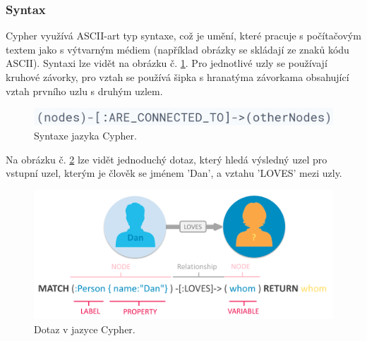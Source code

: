 \subsubsection{Syntax}
Cypher využívá \gls{ASCII}-art typ syntaxe, což je umění, které pracuje s počítačovým textem jako s výtvarným médiem (například obrázky se skládají ze znaků kódu \gls{ASCII}). Syntaxi lze vidět na obrázku č. \ref{fig:cypher_syntax}. Pro jednotlivé uzly se používají kruhové závorky, pro vztah se používá šipka s hranatýma závorkama obsahující vztah prvního uzlu s druhým uzlem.
	\begin{figure}[H]
	\centering
	\includegraphics[width=14cm]{img/databaze/cypher_syntax1}
	\caption{Syntaxe jazyka Cypher.}
	\label{fig:cypher_syntax}
	\end{figure}
\noindent Na obrázku č. \ref{fig:cypher_sample} lze vidět jednoduchý dotaz, který hledá výsledný uzel pro vstupní uzel, kterým je člověk se jménem 'Dan', a vztahu 'LOVES' mezi uzly.
	\begin{figure}[H]
	\centering
	\includegraphics[width=14cm]{img/databaze/sample-cypher}
	\caption{Dotaz v jazyce Cypher.}
	\label{fig:cypher_sample}
	\end{figure}

